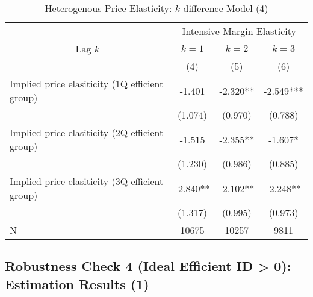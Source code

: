 \documentclass[ review  , 3p ]{elsarticle}
\begin{document}
  \begin{table}

  \caption{\label{tab:kableHeterokDiffElasticitySlide4}Heterogenous Price Elasticity: $k$-difference Model (4)}
  \centering
  \fontsize{8}{10}\selectfont
  \begin{tabular}[t]{lccc}
  \toprule
  \multicolumn{1}{c}{ } & \multicolumn{3}{c}{Intensive-Margin Elasticity} \\
  \cmidrule(l{3pt}r{3pt}){2-4}
  \multicolumn{1}{c}{Lag $k$} & \multicolumn{1}{c}{$k = 1$} & \multicolumn{1}{c}{$k = 2$} & \multicolumn{1}{c}{$k = 3$} \\
  \cmidrule(l{3pt}r{3pt}){1-1} \cmidrule(l{3pt}r{3pt}){2-2} \cmidrule(l{3pt}r{3pt}){3-3} \cmidrule(l{3pt}r{3pt}){4-4}
   & (4) & (5) & (6)\\
  \midrule
  Implied price elasiticity (1Q efficient group) & -1.401 & -2.320** & -2.549***\\
   & (1.074) & (0.970) & (0.788)\\
  Implied price elasiticity (2Q efficient group) & -1.515 & -2.355** & -1.607*\\
   & (1.230) & (0.986) & (0.885)\\
  Implied price elasiticity (3Q efficient group) & -2.840** & -2.102** & -2.248**\\
   & (1.317) & (0.995) & (0.973)\\
  N & 10675 & 10257 & 9811\\
  \bottomrule
  \end{tabular}
  \end{table}

  \hypertarget{robustness-check-4-ideal-efficient-id-0-estimation-results-1}{%
  \subsection{Robustness Check 4 (Ideal Efficient ID \textgreater{} 0): Estimation Results (1)}\label{robustness-check-4-ideal-efficient-id-0-estimation-results-1}}
\end{document}
